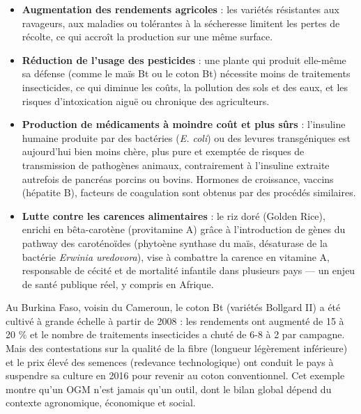 \documentclass[11pt]{article}
\newcommand{\cle}[1]{{\popxbold\color{popdark}#1}}
\newcounter{popsec}
\newcounter{popsub}
\newcommand{\courssub}[1]{%
  \stepcounter{popsub}%
  \par\vspace{9pt}\noindent{\popxbold\fontsize{11.5}{13}\selectfont\color{popink}{\color{poporange}\thepopsec.\thepopsub}\hspace{6pt}#1}\par\nopagebreak\vspace{4pt}
}
\begin{document}
\begin{itemize}
\item \textbf{Augmentation des rendements agricoles} : les variétés résistantes aux ravageurs, aux maladies ou tolérantes à la sécheresse limitent les pertes de récolte, ce qui accroît la production sur une même surface.
\item \textbf{Réduction de l'usage des pesticides} : une plante qui produit elle-même sa défense (comme le maïs Bt ou le coton Bt) nécessite moins de traitements insecticides, ce qui diminue les coûts, la pollution des sols et des eaux, et les risques d'intoxication aiguë ou chronique des agriculteurs.
\item \textbf{Production de médicaments à moindre coût et plus sûrs} : l'insuline humaine produite par des bactéries (\emph{E. coli}) ou des levures transgéniques est aujourd'hui bien moins chère, plus pure et exemptée de risques de transmission de pathogènes animaux, contrairement à l'insuline extraite autrefois de pancréas porcins ou bovins. Hormones de croissance, vaccins (hépatite B), facteurs de coagulation sont obtenus par des procédés similaires.
\item \textbf{Lutte contre les carences alimentaires} : le \cle{riz doré} (Golden Rice), enrichi en bêta-carotène (provitamine A) grâce à l'introduction de gènes du pathway des caroténoïdes (phytoène synthase du maïs, désaturase de la bactérie \emph{Erwinia uredovora}), vise à combattre la carence en vitamine A, responsable de cécité et de mortalité infantile dans plusieurs pays — un enjeu de santé publique réel, y compris en Afrique.
\end{itemize}

\begin{exemplebox}
Au Burkina Faso, voisin du Cameroun, le coton Bt (variétés Bollgard II) a été cultivé à grande échelle à partir de 2008 : les rendements ont augmenté de 15 à 20 \% et le nombre de traitements insecticides a chuté de 6-8 à 2 par campagne. Mais des contestations sur la qualité de la fibre (longueur légèrement inférieure) et le prix élevé des semences (redevance technologique) ont conduit le pays à suspendre sa culture en 2016 pour revenir au coton conventionnel. Cet exemple montre qu'un OGM n'est jamais qu'un outil, dont le bilan global dépend du contexte agronomique, économique et social.
\end{exemplebox}

\courssub{Les risques sanitaires débattus}
\end{document}
